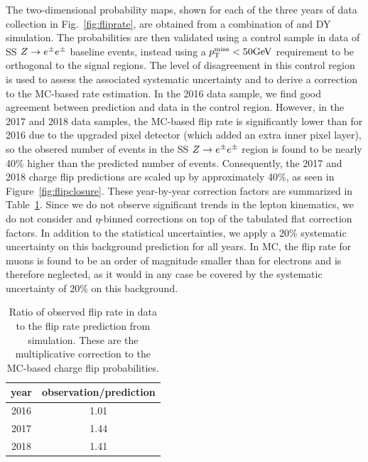 The two-dimensional probability maps, shown for each of the three years of data collection 
in Fig.~\ref{fig:fliprate}, are obtained from a combination of
\ttbar and DY simulation. The probabilities
are then validated using a control sample in data of
SS $Z\rightarrow e^\pm e^\pm$ baseline events, 
instead using a $p_{\mathrm{T}}^\text{miss}<50\text{GeV}$ requirement to be
orthogonal to the signal regions. 
The level of disagreement in this control region
is used to assess the associated systematic uncertainty and to derive a
correction to the MC-based rate estimation.  In the 2016 data sample, we find good
agreement between prediction and data in the control region.
However, in the 2017 and 2018 data samples, the MC-based flip rate
is significantly lower than for
2016 due to the upgraded pixel detector (which added an extra inner pixel layer),
so the obsered number of events in the
SS $Z\rightarrow e^\pm e^\pm$ region is found to be nearly 40\% higher than the
predicted number of events. Consequently, the 2017 and 2018 charge
flip predictions are scaled up by approximately 40\%, as seen in
Figure~\ref{fig:flipclosure}. These year-by-year correction factors are summarized in
Table~\ref{tab:flipscaling}. Since we do not observe significant trends
in the lepton kinematics, we do not consider \pt and $\eta$-binned
corrections on top of the tabulated flat correction factors. 
In addition to the statistical uncertainties, we apply a 20\%
systematic uncertainty on this background prediction for all years. In MC, the
flip rate for muons is found to be an order of magnitude smaller than for
electrons and is therefore neglected, as it would in any case be covered by
the systematic uncertainty of 20\% on this background.



\begin{table}[h]
  \begin{center}
    \small
    \begin{tabular}{c|c}
      \hline
      year & observation/prediction \\
      \hline
        2016 & 1.01  \\
        2017 & 1.44  \\
        2018 & 1.41  \\
      \hline
    \end{tabular}
    \caption{ Ratio of observed flip rate in data to the flip rate prediction from simulation.
     These are the multiplicative correction to the MC-based charge flip probabilities. }
    \label{tab:flipscaling}
  \end{center}
\end{table}


